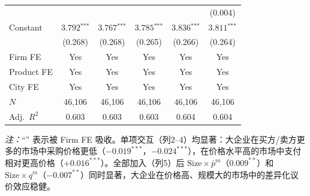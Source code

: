 \documentclass[12pt]{article}
\newcommand{\sym}[1]{\ensuremath{^{\text{#1}}}}
\newcommand{\se}[1]{{\small(#1)}}
\begin{document}
\begin{landscape}
\begin{table}[H]
\begin{threeparttable}
\begin{tabular}{l *{5}{c}}
  & & & & & \se{0.004} \\[3pt]
Constant
  & $3.792\sym{***}$ & $3.767\sym{***}$ & $3.785\sym{***}$ & $3.836\sym{***}$ & $3.811\sym{***}$ \\
  & \se{0.268} & \se{0.268} & \se{0.265} & \se{0.266} & \se{0.264} \\
\midrule
Firm FE    & Yes & Yes & Yes & Yes & Yes \\
Product FE & Yes & Yes & Yes & Yes & Yes \\
City FE    & Yes & Yes & Yes & Yes & Yes \\
$N$        & 46,106 & 46,106 & 46,106 & 46,106 & 46,106 \\
Adj.\ $R^{2}$ & 0.603 & 0.603 & 0.603 & 0.604 & 0.604 \\
\bottomrule
\end{tabular}
\begin{tablenotes}\small
\item \textit{注：}``\textemdash'' 表示被 Firm FE 吸收。单项交互（列2--4）均显著：大企业在买方/卖方更多的市场中采购价格更低（$-0.019^{***}$，$-0.024^{***}$），在价格水平高的市场中支付相对更高价格（$+0.016^{***}$）。全部加入（列5）后 $\mathrm{Size}\times\bar{p}^{m}$（$0.009^{**}$）和 $\mathrm{Size}\times q^{m}$（$-0.007^{**}$）同时显著，大企业在价格高、规模大的市场中的差异化议价效应稳健。
\end{tablenotes}
\end{threeparttable}
\end{table}
\vspace*{\fill}
\end{landscape}
\end{document}
